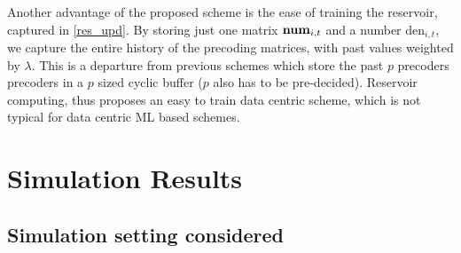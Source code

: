 \documentclass[conference]{IEEEtran}
\newcommand{\highlight}[1]{%
  \colorbox{red!50}{$\displaystyle#1$}}
\begin{document}

{Another advantage of the proposed scheme is the ease of training the reservoir, captured in \eqref{res_upd}.
By storing just one matrix $\text{\textbf{num}}_{i,t}$ and a number $\text{den}_{i,t}$, we capture the entire history of the precoding matrices, with past values weighted by $\lambda$.
This is a departure from previous schemes \cite{Gupt1905:Predictive,6891198,6545375} which store the past $p$ precoders precoders in a $p$ sized cyclic buffer ($p$ also has to be pre-decided).
Reservoir computing, thus proposes an easy to train data centric scheme, which is not typical for data centric ML based schemes.
}

\section{Simulation Results}
\label{section4}

\subsection{Simulation setting considered}
\label{setting}
\end{document}
